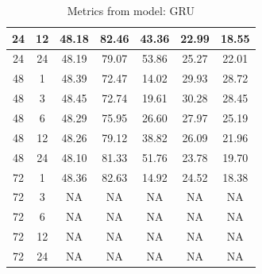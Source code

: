 \begin{table}[H]
\begin{tabular}{|c|c||c|c|c|c|c|}
		\hline
		24 & 12 & 48.18 & 82.46 & 43.36 & 22.99 & 18.55 \\
		\hline
		24 & 24 & 48.19 & 79.07 & 53.86 & 25.27 & 22.01 \\
		\hline
		48 &  1 & 48.39 & 72.47 & 14.02 & 29.93 & 28.72 \\
		\hline
		48 &  3 & 48.45 & 72.74 & 19.61 & 30.28 & 28.45 \\
		\hline
		48 &  6 & 48.29 & 75.95 & 26.60 & 27.97 & 25.19 \\
		\hline
		48 & 12 & 48.26 & 79.12 & 38.82 & 26.09 & 21.96 \\
		\hline
		48 & 24 & 48.10 & 81.33 & 51.76 & 23.78 & 19.70 \\
		\hline
		72 &  1 & 48.36 & 82.63 & 14.92 & 24.52 & 18.38 \\
		\hline
		72 &  3 &    NA &    NA &    NA &    NA &    NA \\
		\hline
		72 &  6 &    NA &    NA &    NA &    NA &    NA \\
		\hline
		72 & 12 &    NA &    NA &    NA &    NA &    NA \\
		\hline
		72 & 24 &    NA &    NA &    NA &    NA &    NA \\
		\hline
	\end{tabular}
	\caption{Metrics from model: GRU}
	\label{tbl:gru}
\end{table}

